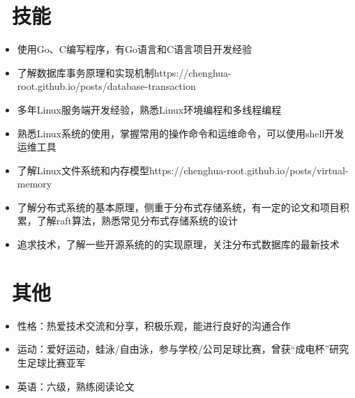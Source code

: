 \documentclass{resume}
\begin{document}
\section{\faCogs\  技能}
\begin{itemize}[parsep=0.5ex]
  \item 使用Go、C编写程序，有Go语言和C语言项目开发经验
  \item 了解数据库事务原理和实现机制https://chenghua-root.github.io/posts/database-transaction
  \item 多年Linux服务端开发经验，熟悉Linux环境编程和多线程编程
  \item 熟悉Linux系统的使用，掌握常用的操作命令和运维命令，可以使用shell开发运维工具
  \item 了解Linux文件系统和内存模型https://chenghua-root.github.io/posts/virtual-memory
  \item 了解分布式系统的基本原理，侧重于分布式存储系统，有一定的论文和项目积累，了解raft算法，熟悉常见分布式存储系统的设计
  \item 追求技术，了解一些开源系统的的实现原理，关注分布式数据库的最新技术
\end{itemize}

\section{\faInfo\  其他}
\begin{itemize}[parsep=0.5ex]
  \item 性格：热爱技术交流和分享，积极乐观，能进行良好的沟通合作
  \item 运动：爱好运动，蛙泳/自由泳，参与学校/公司足球比赛，曾获“成电杯”研究生足球比赛亚军
  \item 英语：六级，熟练阅读论文
\end{itemize}

%
%
\end{document}
